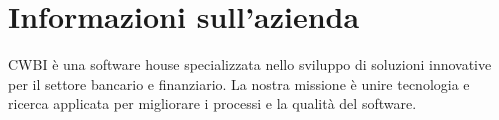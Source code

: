 \section{Informazioni sull'azienda}
CWBI è una software house specializzata nello sviluppo di soluzioni innovative per il settore
bancario e finanziario. La nostra missione è unire tecnologia e ricerca applicata per
migliorare i processi e la qualità del software.
